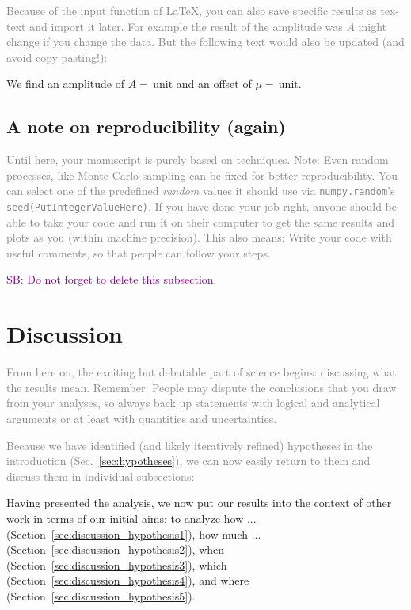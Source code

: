 \documentclass[
  journal=pasa,
  manuscript=Research-Article,
  year=2025,
  volume=X,
]{cup-journal}
\newcommand{\SB}[1]{{\textcolor{purple}{SB: #1}}}
\newcommand{\comment}[1]{\textcolor{gray}{#1}}
\begin{document}
\comment{Because of the input function of \LaTeX, you can also save specific results as tex-text and import it later. For example the result of the amplitude was $A$ might change if you change the data. But the following text would also be updated (and avoid copy-pasting!):}

We find an amplitude of $A = \,\mathrm{unit}$ and an offset of $\mu = \,\mathrm{unit}$.

\subsection{A note on reproducibility (again)}\label{sec:analysis_reproducibility}

\comment{Until here, your manuscript is purely based on techniques. Note: Even random processes, like Monte Carlo sampling can be fixed for better reproducibility. You can select one of the predefined \textit{random} values it should use via \texttt{numpy.random}'s \texttt{seed(PutIntegerValueHere)}. If you have done your job right, anyone should be able to take your code and run it on their computer to get the same results and plots as you (within machine precision). This also means: Write your code with useful comments, so that people can follow your steps.}

\SB{Do not forget to delete this subsection.}

\clearpage
\section{Discussion} \label{sec:discussion}

\comment{From here on, the exciting but debatable part of science begins: discussing what the results mean. Remember: People may dispute the conclusions that you draw from your analyses, so always back up statements with logical and analytical arguments or at least with quantities and uncertainties.}

\comment{Because we have identified (and likely iteratively refined) hypotheses in the introduction (Sec.~\ref{sec:hypotheses}), we can now easily return to them and discuss them in individual subsections:}

Having presented the analysis, we now put our results into the context of other work in terms of our initial aims: to analyze how ... (Section~\ref{sec:discussion_hypothesis1}), how much ...  (Section~\ref{sec:discussion_hypothesis2}), when (Section~\ref{sec:discussion_hypothesis3}), which (Section~\ref{sec:discussion_hypothesis4}), and where (Section~\ref{sec:discussion_hypothesis5}).
\end{document}
